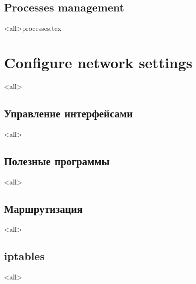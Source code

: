 \subsection{Processes management}
\mode<all>{{processes.tex}}


\section{Configure network settings}
\mode<all>{}

\subsection{Управление интерфейсами}
\mode<all>{}

\subsection{Полезные программы}
\mode<all>{}

\subsection{Маршрутизация}
\mode<all>{}

\subsection{iptables}
\mode<all>{}


